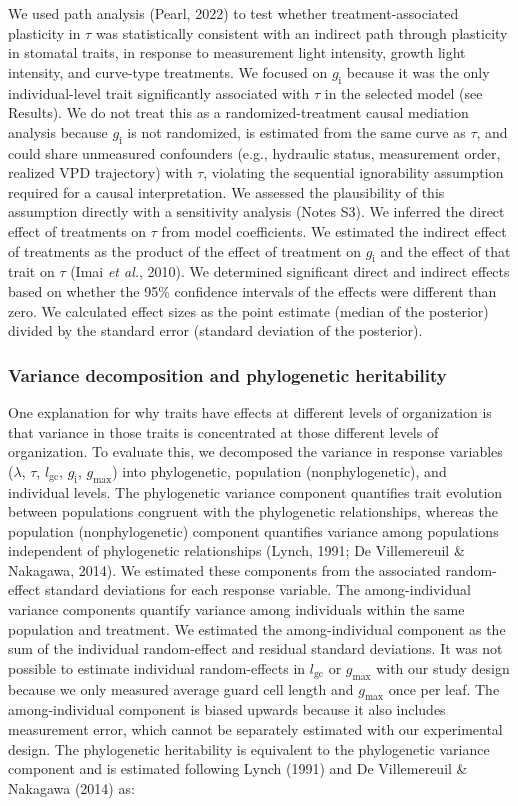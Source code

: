 \documentclass[
  letterpaper,
  DIV=11,
  numbers=noendperiod]{scrartcl}
\newcommand{\gcl}{$l_\mathrm{gc}$}
\newcommand{\gi}{$g_\mathrm{i}$}
\newcommand{\gmax}{$g_\mathrm{max}$}
\begin{document}
We used path analysis (Pearl, 2022) to test whether treatment-associated
plasticity in \(\tau\) was statistically consistent with an indirect
path through plasticity in stomatal traits, in response to measurement
light intensity, growth light intensity, and curve-type treatments. We
focused on \gi{} because it was the only individual-level trait
significantly associated with \(\tau\) in the selected model (see
Results). We do not treat this as a randomized-treatment causal
mediation analysis because \gi{} is not randomized, is estimated from
the same curve as \(\tau\), and could share unmeasured confounders
(e.g., hydraulic status, measurement order, realized VPD trajectory)
with \(\tau\), violating the sequential ignorability assumption required
for a causal interpretation. We assessed the plausibility of this
assumption directly with a sensitivity analysis (Notes S3). We inferred
the direct effect of treatments on \(\tau\) from model coefficients. We
estimated the indirect effect of treatments as the product of the effect
of treatment on \gi{} and the effect of that trait on \(\tau\) (Imai
\emph{et al.}, 2010). We determined significant direct and indirect
effects based on whether the 95\% confidence intervals of the effects
were different than zero. We calculated effect sizes as the point
estimate (median of the posterior) divided by the standard error
(standard deviation of the posterior).

\subsubsection{Variance decomposition and phylogenetic
heritability}\label{variance-decomposition-and-phylogenetic-heritability}

One explanation for why traits have effects at different levels of
organization is that variance in those traits is concentrated at those
different levels of organization. To evaluate this, we decomposed the
variance in response variables (\(\lambda\), \(\tau\), \gcl, \gi, \gmax)
into phylogenetic, population (nonphylogenetic), and individual levels.
The phylogenetic variance component quantifies trait evolution between
populations congruent with the phylogenetic relationships, whereas the
population (nonphylogenetic) component quantifies variance among
populations independent of phylogenetic relationships (Lynch, 1991; De
Villemereuil \& Nakagawa, 2014). We estimated these components from the
associated random-effect standard deviations for each response variable.
The among-individual variance components quantify variance among
individuals within the same population and treatment. We estimated the
among-individual component as the sum of the individual random-effect
and residual standard deviations. It was not possible to estimate
individual random-effects in \gcl{} or \gmax{} with our study design
because we only measured average guard cell length and \gmax{} once per
leaf. The among-individual component is biased upwards because it also
includes measurement error, which cannot be separately estimated with
our experimental design. The phylogenetic heritability is equivalent to
the phylogenetic variance component and is estimated following Lynch
(1991) and De Villemereuil \& Nakagawa (2014) as:
\end{document}
